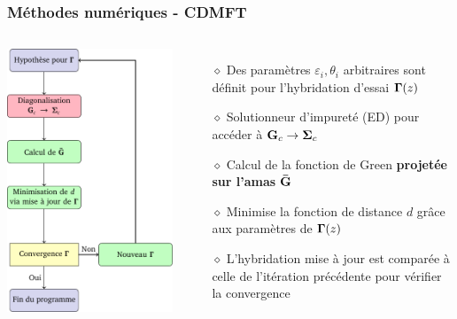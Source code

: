 \begin{frame}
    \frametitle{Méthodes numériques - CDMFT}
    \begin{columns}
        \hspace{1cm}
        \includegraphics[scale=0.5]{./figures/theory/flow_chart.pdf}
        \begin{itemize}
            \item[$\diamond$] Des paramètres $\varepsilon_i, \theta_i$ arbitraires
                sont définit pour l'hybridation d'essai $\vb{\Gamma}(z)$
            \pause
            \item[$\diamond$] Solutionneur d'impureté (ED) pour accéder à
                $\vb{G}_c\to\vb{\Sigma}_c$
            \pause
            \item[$\diamond$] Calcul de la fonction de Green \textbf{projetée sur l'amas} $\vb{\bar{G}}$
            \pause
            \item[$\diamond$] Minimise la fonction de distance $d$ grâce aux paramètres de $\vb{\Gamma}(z)$
            \pause
            \item[$\diamond$] L'hybridation mise à jour est comparée à celle
                de l'itération précédente pour vérifier la convergence
        \end{itemize}
    \end{columns}
\end{frame}

